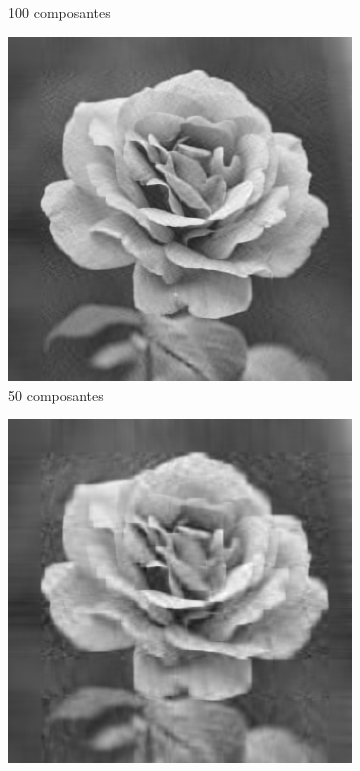 \documentclass[a4paper,12pt]{report}
\begin{document}
\begin{figure}[H]
\begin{subfigure}{0.18\textwidth}
    \caption*{100 composantes}
  \end{subfigure}\hfill
  \begin{subfigure}{0.18\textwidth}
    \includegraphics[width=\linewidth]{images/pca_50.png}
    \caption*{50 composantes}
  \end{subfigure}\hfill
  \begin{subfigure}{0.18\textwidth}
    \includegraphics[width=\linewidth]{images/pca_25.png}

\end{subfigure}
\end{figure}
\end{document}
